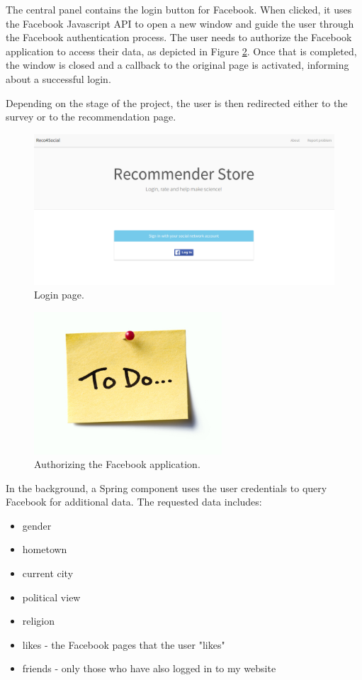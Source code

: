 \documentclass[12pt]{report}
\begin{document}
The central panel contains the login button for Facebook. When clicked, it uses the Facebook Javascript API to open a new window and guide the user through the Facebook authentication process. The user needs to authorize the Facebook application to access their data, as depicted in Figure \ref{fig.login.fb_app_auth}. Once that is completed, the window is closed and a callback to the original page is activated, informing about a successful login.

Depending on the stage of the project, the user is then redirected either to the survey or to the recommendation page. 

\begin{figure}[!t]
\centering
\includegraphics[width=\textwidth]{reco4_login.png} 
\caption[Login page.]{Login page.}
\label{fig.login}
\end{figure}

\begin{figure}[!t]
\centering
\includegraphics[width=7cm]{todo.jpg} 
\caption[Authorizing the Facebook application.]{Authorizing the Facebook application.}
\label{fig.login.fb_app_auth}
\end{figure}

In the background, a Spring component uses the user credentials to query Facebook for additional data. The requested data includes:
\begin{itemize}
\item gender
\item hometown
\item current city
\item political view
\item religion
\item likes - the Facebook pages that the user "likes"
\item friends - only those who have also logged in to my website
\end{itemize}
\end{document}
